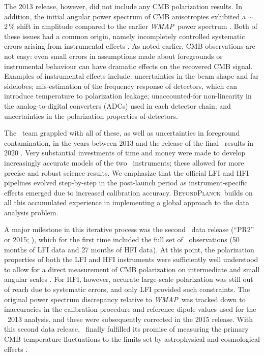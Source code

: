 \documentclass[twocolumn]{aa}
\def\WMAP{\emph{WMAP}}
\newcommand{\BP}{\textsc{BeyondPlanck}}
\begin{document}
The 2013 release, however, did not include any CMB polarization
results. In addition, the initial angular power spectrum of CMB
anisotropies exhibited a $\sim$$2\,\%$ shift in amplitude compared to
the earlier \WMAP\ power spectrum \citep{planck2013-p08}. Both of
these issues had a common origin, namely incompletely controlled
systematic errors arising from instrumental effects
\citep{planck2014-a01}.  As noted earlier, CMB observations are not
easy: even small errors in assumptions made about foregrounds or
instrumental behaviour can have dramatic effects on the recovered CMB
signal.  Examples of instrumental effects include: uncertainties in
the beam shape and far sidelobes; mis-estimation of the frequency
response of detectors, which can introduce temperature to polarization
leakage; unaccounted-for non-linearity in the analog-to-digital
converters (ADCs) used in each detector chain; and uncertainties in
the polarization properties of detectors.

The \Planck\ team grappled with all of these, as well as uncertainties
in foreground contamination, in the years between 2013 and the release
of the final \Planck\ results in 2020 \citep{planck2016-l01}.  Very
substantial investments of time and money were made to develop
increasingly accurate models of the two \Planck\ instruments; these
allowed for more precise and robust science results. We emphasize that
the official LFI and HFI pipelines evolved step-by-step in the
post-launch period as instrument-specific effects emerged due to
increased calibration accuracy. \BP\ builds on all this accumulated
experience in implementing a global approach to the data analysis
problem.

A major milestone in this iterative process was the second
\Planck\ data release (``PR2'' or 2015; \citealp{planck2014-a01}),
which for the first time included the full set of
\Planck\ observations (50 months of LFI data and 27 months of HFI
data). At this point, the polarization properties of both the LFI and
HFI instruments were sufficiently well understood to allow for a
direct measurement of CMB polarization on intermediate and small
angular scales \citep{planck2014-a13}.  For HFI, however, accurate
large-scale polarization was still out of reach due to systematic
errors, and only LFI provided such constraints. The original power
spectrum discrepancy relative to \WMAP\ was tracked down to
inaccuracies in the calibration procedure and reference dipole values
used for the \Planck\ 2013 analysis, and these were subsequently
corrected in the 2015 release. With this second data release,
\Planck\ finally fulfilled its promise of measuring the primary CMB
temperature fluctuations to the limits set by astrophysical and
cosmological effects \citep{planck2014-a01}.  
\end{document}
